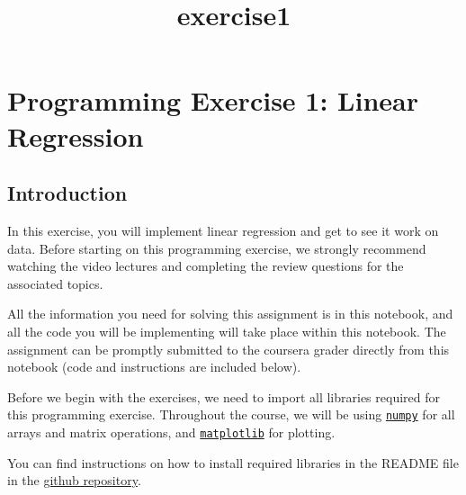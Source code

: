 \documentclass[11pt]{article}
\title{exercise1}
\begin{document}
    
    
    \maketitle
    
    

    
    \section{Programming Exercise 1: Linear
Regression}\label{programming-exercise-1-linear-regression}

\subsection{Introduction}\label{introduction}

In this exercise, you will implement linear regression and get to see it
work on data. Before starting on this programming exercise, we strongly
recommend watching the video lectures and completing the review
questions for the associated topics.

All the information you need for solving this assignment is in this
notebook, and all the code you will be implementing will take place
within this notebook. The assignment can be promptly submitted to the
coursera grader directly from this notebook (code and instructions are
included below).

Before we begin with the exercises, we need to import all libraries
required for this programming exercise. Throughout the course, we will
be using \href{http://www.numpy.org/}{\texttt{numpy}} for all arrays and
matrix operations, and
\href{https://matplotlib.org/}{\texttt{matplotlib}} for plotting.

You can find instructions on how to install required libraries in the
README file in the
\href{https://github.com/dibgerge/ml-coursera-python-assignments}{github
repository}.
\end{document}
